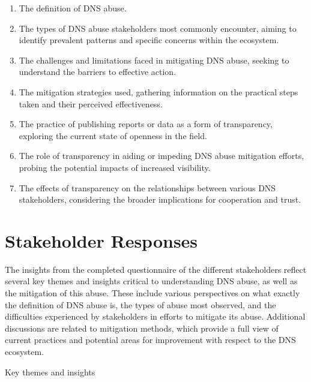  \begin{enumerate}
 \item The definition of DNS abuse. 
  \item The types of DNS abuse stakeholders most commonly encounter, aiming to identify prevalent patterns and specific concerns within the ecosystem.
  
  \item The challenges and limitations faced in mitigating DNS abuse, seeking to understand the barriers to effective action.
  
  \item The mitigation strategies used, gathering information on the practical steps taken and their perceived effectiveness.
  
  \item The practice of publishing reports or data as a form of transparency, exploring the current state of openness in the field.
  
  \item The role of transparency in aiding or impeding DNS abuse mitigation efforts, probing the potential impacts of increased visibility.
  
  \item  The effects of transparency on the relationships between various DNS stakeholders, considering the broader implications for cooperation and trust.
\end{enumerate}


\section{Stakeholder Responses} 

The insights from the completed questionnaire of the different stakeholders reflect several key themes and insights critical to understanding DNS abuse, as well as the mitigation of this abuse. These include various perspectives on what exactly the definition of DNS abuse is, the types of abuse most observed, and the difficulties experienced by stakeholders in efforts to mitigate its abuse. Additional discussions are related to mitigation methods, which provide a full view of current practices and potential areas for improvement with respect to the DNS ecosystem.

Key themes and insights

